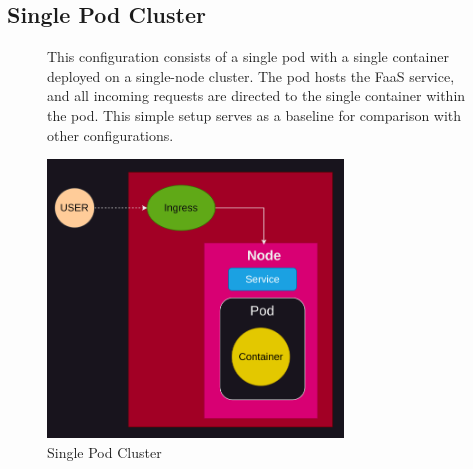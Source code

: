\documentclass{article}
\begin{document}
\subsection{Single Pod Cluster}
\nobreak
\vspace{-30px}
\begin{figure}[h]
    \begin{minipage}[t]{0.6\textwidth}
        \vspace{-120px}
        This configuration consists of a single pod with a single container deployed on
        a single-node cluster. The pod hosts the FaaS service, and all incoming
        requests are directed to the single container within the pod. This simple setup
        serves as a baseline for comparison with other configurations.
    \end{minipage}
    \hfill
    \begin{minipage}[b]{0.4\textwidth}
        \centering
        \includegraphics[width=0.7\textwidth]{../images/single_pod.png}
        \caption{Single Pod Cluster}
        \label{fig:single_pod_cluster}
    \end{minipage}
\end{figure}

\vspace{-10px}
\end{document}
